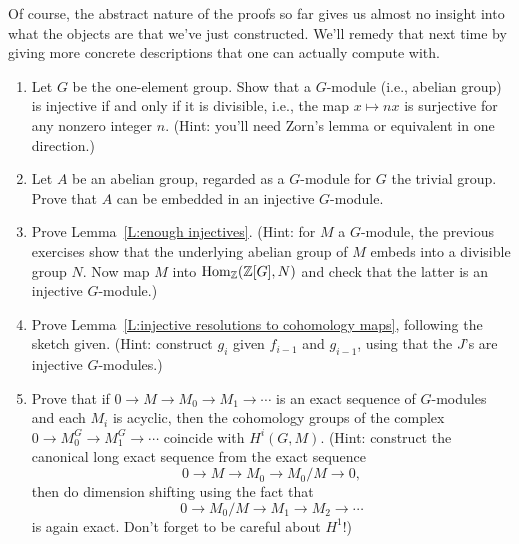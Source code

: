 Of course, the abstract nature of the proofs so far gives us almost no
insight into what the objects are that we've just constructed. We'll remedy
that next time by giving more concrete descriptions that one can actually
compute with.


\begin{enumerate}
\item
Let $G$ be the one-element group. Show that a $G$-module 
(i.e., abelian group) is injective if and
only if it is divisible, i.e., the map $x \mapsto nx$ is surjective
for any nonzero integer $n$. (Hint: you'll need Zorn's lemma or equivalent
in one direction.)
\item
Let $A$ be an abelian group, regarded as a $G$-module for $G$ the trivial
group. Prove that $A$ can be embedded in an injective $G$-module.
\item
Prove Lemma~\ref{L:enough injectives}. (Hint: 
for $M$ a $G$-module, the previous exercises show that the underlying abelian group of $M$ embeds into a divisible group $N$. Now map
$M$ into $\operatorname{Hom}_{\mathbb{Z}}(\mathbb{Z}[G], N)$ and check that the latter is an injective $G$-module.)
\item
Prove Lemma~\ref{L:injective resolutions to cohomology maps}, following the sketch given. (Hint: construct $g_i$ given
$f_{i-1}$ and $g_{i-1}$, using that the $J$'s are injective $G$-modules.)
\item
Prove that if $0 \to M \to M_0 \to M_1 \to \cdots$ is an exact sequence of $G$-modules
and each $M_i$ is acyclic, then the cohomology groups of the complex
$0 \to M_0^G \to M_1^G \to \cdots$ coincide with $H^i(G, M)$. 
(Hint: construct the canonical long exact sequence from the
exact sequence 
\[
0 \to M \to M_0 \to M_0/M \to 0,
\]
then do dimension shifting using the fact that
\[
0 \to M_0/M \to M_1 \to M_2 \to \cdots
\]
is again exact. Don't forget to be careful about $H^1$!)
\end{enumerate}

%


